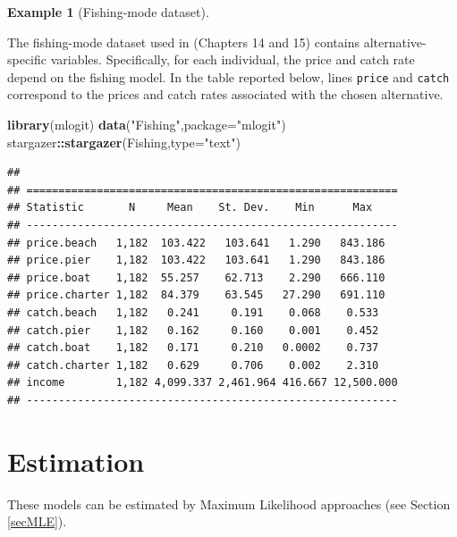 \documentclass[
  12pt,
]{book}
\newenvironment{Shaded}{\begin{snugshade}}{\end{snugshade}}
\newcommand{\AttributeTok}[1]{\textcolor[rgb]{0.13,0.29,0.53}{#1}}
\newcommand{\FunctionTok}[1]{\textcolor[rgb]{0.13,0.29,0.53}{\textbf{#1}}}
\newcommand{\NormalTok}[1]{#1}
\newcommand{\SpecialCharTok}[1]{\textcolor[rgb]{0.81,0.36,0.00}{\textbf{#1}}}
\newcommand{\StringTok}[1]{\textcolor[rgb]{0.31,0.60,0.02}{#1}}
\theoremstyle{definition}
\theoremstyle{definition}
\newtheorem{example}{Example}[chapter]
\theoremstyle{definition}
\theoremstyle{definition}
\theoremstyle{remark}
\begin{document}
\begin{example}[Fishing-mode dataset]
\protect\hypertarget{exm:FishingTable}{}\label{exm:FishingTable}

The fishing-mode dataset used in \citet{Cameron_Trivedi_2005} (Chapters 14 and 15) contains alternative-specific variables. Specifically, for each individual, the price and catch rate depend on the fishing model. In the table reported below, lines \texttt{price} and \texttt{catch} correspond to the prices and catch rates associated with the chosen alternative.

\begin{Shaded}
\begin{Highlighting}[]
\FunctionTok{library}\NormalTok{(mlogit)}
\FunctionTok{data}\NormalTok{(}\StringTok{"Fishing"}\NormalTok{,}\AttributeTok{package=}\StringTok{"mlogit"}\NormalTok{)}
\NormalTok{stargazer}\SpecialCharTok{::}\FunctionTok{stargazer}\NormalTok{(Fishing,}\AttributeTok{type=}\StringTok{"text"}\NormalTok{)}
\end{Highlighting}
\end{Shaded}

\begin{verbatim}
## 
## ==========================================================
## Statistic       N     Mean    St. Dev.    Min      Max    
## ----------------------------------------------------------
## price.beach   1,182  103.422   103.641   1.290   843.186  
## price.pier    1,182  103.422   103.641   1.290   843.186  
## price.boat    1,182  55.257    62.713    2.290   666.110  
## price.charter 1,182  84.379    63.545   27.290   691.110  
## catch.beach   1,182   0.241     0.191    0.068    0.533   
## catch.pier    1,182   0.162     0.160    0.001    0.452   
## catch.boat    1,182   0.171     0.210   0.0002    0.737   
## catch.charter 1,182   0.629     0.706    0.002    2.310   
## income        1,182 4,099.337 2,461.964 416.667 12,500.000
## ----------------------------------------------------------
\end{verbatim}

\end{example}

\hypertarget{estimation}{%
\section{Estimation}\label{estimation}}

These models can be estimated by Maximum Likelihood approaches (see Section \ref{secMLE}).
\end{document}

